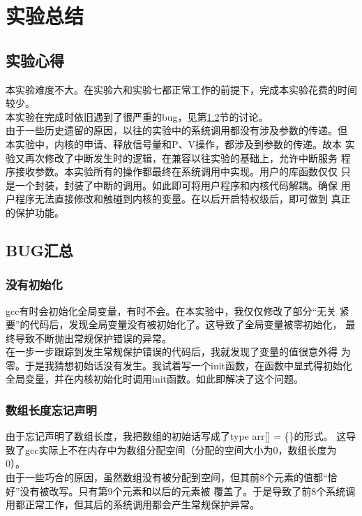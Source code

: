 \documentclass[a4paper]{article}
\begin{document}
\section{实验总结}
    \subsection{实验心得}
    本实验难度不大。在实验六和实验七都正常工作的前提下，完成本实验花费的时间
    较少。\\ 

    本实验在完成时依旧遇到了很严重的bug，见第\ref{sec:bug}节的讨论。\\ 

    由于一些历史遗留的原因，以往的实验中的系统调用都没有涉及参数的传递。但
    本实验中，内核的申请、释放信号量和P、V操作，都涉及到参数的传递。故本
    实验又再次修改了中断发生时的逻辑，在兼容以往实验的基础上，允许中断服务
    程序接收参数。本实验所有的操作都最终在系统调用中实现。用户的库函数仅仅
    只是一个封装，封装了中断的调用。如此即可将用户程序和内核代码解耦。确保
    用户程序无法直接修改和触碰到内核的变量。在以后开启特权级后，即可做到
    真正的保护功能。
    \subsection{BUG汇总}\label{sec:bug}
    \subsubsection{没有初始化}
    gcc有时会初始化全局变量，有时不会。在本实验中，我仅仅修改了部分``无关
    紧要''的代码后，发现全局变量没有被初始化了。这导致了全局变量被零初始化，
    最终导致不断抛出常规保护错误的异常。\\ 

    在一步一步跟踪到发生常规保护错误的代码后，我就发现了变量的值很意外得
    为零。于是我猜想初始话没有发生。我试着写一个init函数，在函数中显式得初始化
    全局变量，并在内核初始化时调用init函数。如此即解决了这个问题。
    \subsubsection{数组长度忘记声明}
    由于忘记声明了数组长度，我把数组的初始话写成了type arr[] = \{\}的形式。
    这导致了gcc实际上不在内存中为数组分配空间（分配的空间大小为0，数组长度为
    0）。\\ 

    由于一些巧合的原因，虽然数组没有被分配到空间，但其前8个元素的值都``恰好''没有被改写。只有第9个元素和以后的元素被
    覆盖了。于是导致了前8个系统调用都正常工作，但其后的系统调用都会产生常规保护异常。\\ 
\end{document}
